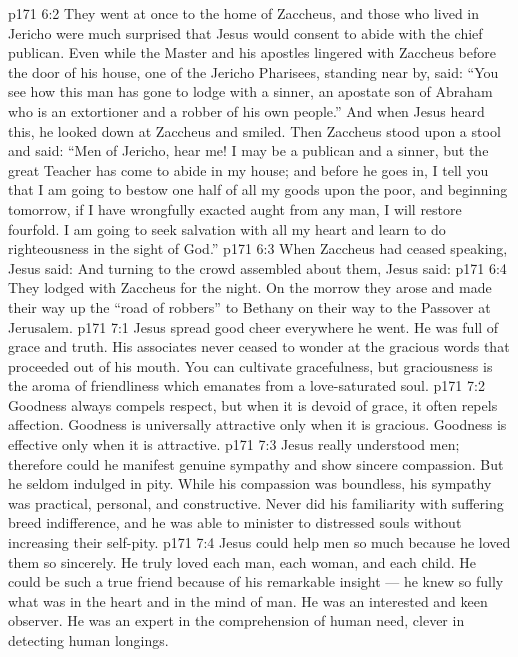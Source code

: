 \vs p171 6:2 They went at once to the home of Zaccheus, and those who lived in Jericho were much surprised that Jesus would consent to abide with the chief publican. Even while the Master and his apostles lingered with Zaccheus before the door of his house, one of the Jericho Pharisees, standing near by, said: “You see how this man has gone to lodge with a sinner, an apostate son of Abraham who is an extortioner and a robber of his own people.” And when Jesus heard this, he looked down at Zaccheus and smiled. Then Zaccheus stood upon a stool and said: “Men of Jericho, hear me! I may be a publican and a sinner, but the great Teacher has come to abide in my house; and before he goes in, I tell you that I am going to bestow one half of all my goods upon the poor, and beginning tomorrow, if I have wrongfully exacted aught from any man, I will restore fourfold. I am going to seek salvation with all my heart and learn to do righteousness in the sight of God.”
\vs p171 6:3 When Zaccheus had ceased speaking, Jesus said:  And turning to the crowd assembled about them, Jesus said: 
\vs p171 6:4 They lodged with Zaccheus for the night. On the morrow they arose and made their way up the “road of robbers” to Bethany on their way to the Passover at Jerusalem.
\vs p171 7:1 Jesus spread good cheer everywhere he went. He was full of grace and truth. His associates never ceased to wonder at the gracious words that proceeded out of his mouth. You can cultivate gracefulness, but graciousness is the aroma of friendliness which emanates from a love\hyp{}saturated soul.
\vs p171 7:2 Goodness always compels respect, but when it is devoid of grace, it often repels affection. Goodness is universally attractive only when it is gracious. Goodness is effective only when it is attractive.
\vs p171 7:3 Jesus really understood men; therefore could he manifest genuine sympathy and show sincere compassion. But he seldom indulged in pity. While his compassion was boundless, his sympathy was practical, personal, and constructive. Never did his familiarity with suffering breed indifference, and he was able to minister to distressed souls without increasing their self\hyp{}pity.
\vs p171 7:4 Jesus could help men so much because he loved them so sincerely. He truly loved each man, each woman, and each child. He could be such a true friend because of his remarkable insight --- he knew so fully what was in the heart and in the mind of man. He was an interested and keen observer. He was an expert in the comprehension of human need, clever in detecting human longings.
